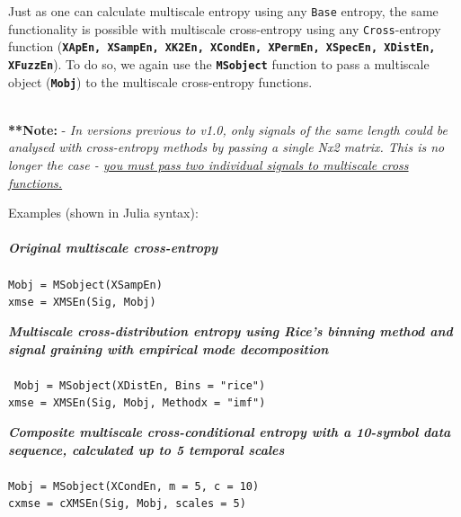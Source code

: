 \documentclass[12pt, a4paper, titlepage, openany]{book}
\begin{document}
Just as one can calculate multiscale entropy using any \texttt{Base} entropy, the same functionality is possible with multiscale cross-entropy using any \texttt{Cross}-entropy function (\texttt{\textbf{XApEn, XSampEn, XK2En, XCondEn, XPermEn, XSpecEn, XDistEn, XFuzzEn}}). To do so, we again use the \texttt{\textbf{MSobject}} function to pass a multiscale object (\texttt{\textbf{Mobj}}) to the multiscale cross-entropy functions.

\begin{center}
 \ \\

\textbf{**Note:} -  \emph{In versions previous to v1.0, only signals of the same length could be analysed with cross-entropy methods by passing a single Nx2 matrix. This is no longer the case - \underline{you must pass two individual signals to multiscale cross functions.}}
\end{center}


 
\noindent Examples (shown in Julia syntax)$\colon$ \footnotesize
\\ \ \\ \noindent \emph{\textbf{Original multiscale cross-entropy}} \cite{MS1}
\\ \ \\ \indent \texttt{Mobj = MSobject(XSampEn) \\
\indent xmse = XMSEn(Sig, Mobj)}

\noindent \emph{\textbf{Multiscale cross-distribution entropy using Rice's binning method and signal graining with empirical mode decomposition}} \cite{MS6} \cite{Dist1}\\
\\ \ \indent \texttt{Mobj = MSobject(XDistEn, Bins = "rice")\\
\indent xmse = XMSEn(Sig, Mobj, Methodx = "imf")}

\noindent \emph{\textbf{Composite multiscale cross-conditional entropy with a 10-symbol data sequence, calculated up to 5 temporal scales}} \cite{cMS1} \cite{Cond1}
\\ \ \\ \indent \texttt{Mobj = MSobject(XCondEn, m = 5, c = 10)\\
\indent cxmse = cXMSEn(Sig, Mobj, scales = 5)}
\end{document}
